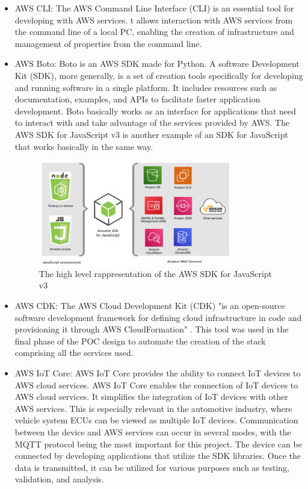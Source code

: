 \begin{itemize}
    \item AWS CLI: The AWS Command Line Interface (CLI) is an essential tool for developing with AWS services. t allows interaction with AWS services from the command line of a local PC, enabling the creation of infrastructure and management of properties from the command line.
    \item AWS Boto: Boto is an AWS SDK made for Python. A software Development Kit (SDK), more generally, is a set of creation tools specifically for developing and running software in a single platform. It includes resources such as documentation, examples, and APIs to facilitate faster application development. Boto basically works as an interface for applications that need to interact with and take advantage of the services provided by AWS. The AWS SDK for JavaScript v3 is another example of an SDK for JavaScript that works basically in the same way.
    \begin{figure}[h]  %
        \centering
        \includegraphics[width=0.8\textwidth]{images/AWSSDK.png}  %
        \caption{The high level rappresentation of the AWS SDK for JavaScript v3 \cite{AWSSDK}}
        \label{fig:AWSSDK}
    \end{figure}
    \item AWS CDK: The AWS Cloud Development Kit (CDK) "is an open-source software development framework for defining cloud infrastructure in code and provisioning it through AWS CloudFormation" \cite{WhatIsTheAWSCDK}. This tool was used in the final phase of the POC design to automate the creation of the stack comprising all the services used.
    \item AWS IoT Core: AWS IoT Core provides the ability to connect IoT devices to AWS cloud services. AWS IoT Core enables the connection of IoT devices to AWS cloud services. It simplifies the integration of IoT devices with other AWS services. This is especially relevant in the automotive industry, where vehicle system ECUs can be viewed as multiple IoT devices. Communication between the device and AWS services can occur in several modes, with the MQTT protocol being the most important for this project. The device can be connected by developing applications that utilize the SDK libraries. Once the data is transmitted, it can be utilized for various purposes such as testing, validation, and analysis.

\end{itemize}
